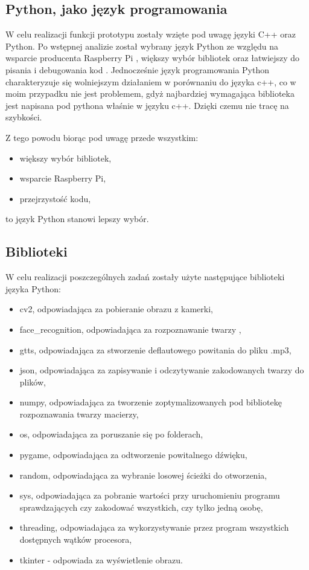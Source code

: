 \documentclass[a4paper,12pt,reqno]{article}
\begin{document}
\subsection{Python, jako język programowania}
W celu realizacji funkcji prototypu zostały wzięte pod uwagę języki C++ oraz Python. Po wstępnej analizie został wybrany język Python ze względu na wsparcie producenta Raspberry Pi \cite{watki_jak_pisac}, większy wybór bibliotek \cite{face_detection_and_recognition_using_opencv} oraz łatwiejszy do pisania i debugowania kod \cite{face_recognition_with_python}. Jednocześnie język programowania Python charakteryzuje się wolniejszym działaniem w porównaniu do języka c++, co w moim przypadku nie jest problemem, gdyż najbardziej wymagająca biblioteka jest napisana pod pythona właśnie w języku c++. Dzięki czemu nie tracę na szybkości.

Z tego powodu biorąc pod uwagę przede wszystkim:
\begin{itemize}
\item większy wybór bibliotek,
\item wsparcie Raspberry Pi,
\item przejrzystość kodu,
\end{itemize}
to język Python stanowi lepszy wybór.
\subsection{Biblioteki}
W celu realizacji poszczególnych zadań zostały użyte następujące biblioteki języka Python:
\begin{itemize}
\item cv2, odpowiadająca za pobieranie obrazu z kamerki,
\item face\_recognition, odpowiadająca za rozpoznawanie twarzy \cite{face_recognition_github} \cite{face_recognition_implementation_on_raspberrypi} \cite{face_recognition_python},
\item gtts, odpowiadająca za stworzenie deflautowego powitania do pliku .mp3,
\item json, odpowiadająca za zapisywanie i odczytywanie zakodowanych twarzy do plików,
\item numpy, odpowiadająca za tworzenie zoptymalizowanych pod bibliotekę rozpoznawania twarzy macierzy,
\item os, odpowiadająca za poruszanie się po folderach,
\item pygame, odpowiadająca za odtworzenie powitalnego dźwięku,
\item random, odpowiadająca za wybranie losowej ścieżki do otworzenia,
\item sys, odpowiadająca za pobranie wartości przy uruchomieniu programu sprawdzających czy zakodować wszystkich, czy tylko jedną osobę,
\item threading, odpowiadająca za wykorzystywanie przez program wszystkich dostępnych wątków procesora,
\item tkinter - odpowiada za wyświetlenie obrazu.
\end{itemize}
\end{document}
